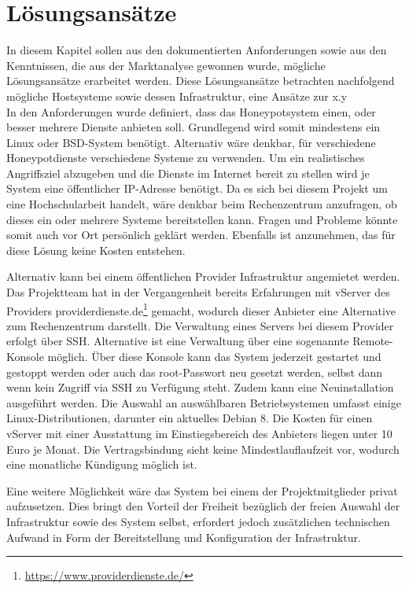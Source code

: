 \chapter{Lösungsansätze}
\label{ch:Lösungsansätze}

In diesem Kapitel sollen aus den dokumentierten Anforderungen sowie aus den Kenntnissen, die aus der Marktanalyse gewonnen wurde, mögliche Lösungsansätze erarbeitet werden. Diese Lösungsansätze betrachten nachfolgend mögliche Hostsysteme sowie dessen Infrastruktur, eine Ansätze zur x.y\\

In den Anforderungen wurde definiert, dass das Honeypotsystem einen, oder besser mehrere Dienste anbieten soll. Grundlegend wird somit mindestens ein Linux oder BSD-System benötigt. Alternativ wäre denkbar, für verschiedene Honeypotdienste verschiedene Systeme zu verwenden. Um ein realistisches Angriffsziel abzugeben und die Dienste im Internet bereit zu stellen wird je System eine öffentlicher IP-Adresse benötigt. Da es sich bei diesem Projekt um eine Hochschularbeit handelt, wäre denkbar beim Rechenzentrum anzufragen, ob dieses ein oder mehrere Systeme bereitstellen kann. Fragen und Probleme könnte somit auch vor Ort persönlich geklärt werden. Ebenfalls ist anzunehmen, das für diese Lösung keine Kosten entstehen.


Alternativ kann bei einem öffentlichen Provider Infrastruktur angemietet werden. Das Projektteam hat in der Vergangenheit bereits Erfahrungen mit vServer des Providers providerdienste.de\footnote{\url{https://www.providerdienste.de/}} gemacht, wodurch dieser Anbieter eine Alternative zum Rechenzentrum darstellt. Die Verwaltung eines Servers bei diesem Provider erfolgt über SSH. Alternative ist eine Verwaltung über eine sogenannte Remote-Konsole möglich. Über diese Konsole  kann das System jederzeit gestartet und gestoppt werden oder auch das root-Passwort neu gesetzt werden, selbst dann wenn kein Zugriff via SSH zu Verfügung steht. Zudem kann eine Neuinstallation ausgeführt werden. Die Auswahl an auswählbaren Betriebsystemen umfasst einige Linux-Distributionen, darunter ein aktuelles Debian 8. Die Kosten für einen vServer mit einer Ausstattung im Einstiegsbereich des Anbieters liegen unter 10 Euro je Monat. Die Vertragsbindung sieht keine Mindestlauflaufzeit vor, wodurch eine monatliche Kündigung möglich ist.

Eine weitere Möglichkeit wäre das System bei einem der Projektmitglieder privat aufzusetzen. Dies bringt den Vorteil der Freiheit bezüglich der freien Auswahl der Infrastruktur sowie des System selbst, erfordert jedoch zusätzlichen technischen Aufwand in Form der Bereitstellung und Konfiguration der Infrastruktur.\\

